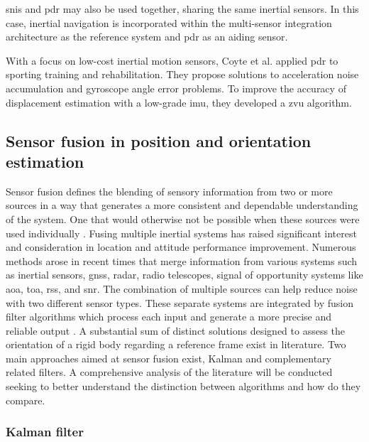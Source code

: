 \acrshort{snis} and \acrshort{pdr} may also be used together, sharing the same inertial sensors. In this case, inertial navigation is incorporated within the multi-sensor integration architecture as the reference system and \acrshort{pdr} as an aiding sensor.


With a focus on low-cost inertial motion sensors, Coyte et al. \cite{coyte2013displacement} applied \acrshort{pdr} to sporting training and rehabilitation. They propose solutions to acceleration noise accumulation and gyroscope angle error problems. To improve the accuracy of displacement estimation with a low-grade \acrshort{imu}, they developed a \acrshort{zvu} algorithm.

\subsection{Sensor fusion in position and orientation estimation }

Sensor fusion defines the blending of sensory information from two or more sources in a way that generates a more consistent and dependable understanding of the system. One that would otherwise not be possible when these sources were used individually \cite{hall1997introduction}. Fusing multiple inertial systems has raised significant interest and consideration in location and attitude performance improvement. Numerous methods arose in recent times that merge information from various systems such as inertial sensors, \acrshort{gnss}, radar, radio telescopes, signal of opportunity systems like \acrfull{aoa}, \acrfull{toa}, \acrfull{rss}, and \acrfull{snr}. The combination of multiple sources can help reduce noise with two different sensor types. These separate systems are integrated by fusion filter algorithms which process each input and generate a more precise and reliable output \cite{elmenreich2002introduction}. A substantial sum of distinct solutions designed to assess the orientation of a rigid body regarding a reference frame exist in literature. Two main approaches aimed at sensor fusion exist, Kalman and complementary related filters. A comprehensive analysis of the literature will be conducted seeking to better understand the distinction between algorithms and how do they compare.

\subsubsection{Kalman filter}

